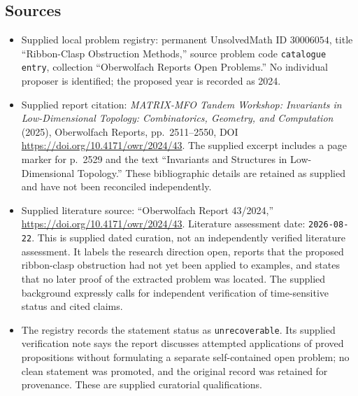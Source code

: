 \documentclass[11pt]{article}
\begin{document}
\subsection{Sources}
\begin{itemize}
\item Supplied local problem registry: permanent UnsolvedMath ID \(30006054\), title ``Ribbon-Clasp Obstruction Methods,'' source problem code \texttt{catalogue entry}, collection ``Oberwolfach Reports Open Problems.'' No individual proposer is identified; the proposed year is recorded as 2024.
\item Supplied report citation: \emph{MATRIX-MFO Tandem Workshop: Invariants in Low-Dimensional Topology: Combinatorics, Geometry, and Computation} (2025), Oberwolfach Reports, pp.\ 2511--2550, DOI \url{https://doi.org/10.4171/owr/2024/43}. The supplied excerpt includes a page marker for p.\ 2529 and the text ``Invariants and Structures in Low-Dimensional Topology.'' These bibliographic details are retained as supplied and have not been reconciled independently.
\item Supplied literature source: ``Oberwolfach Report 43/2024,'' \url{https://doi.org/10.4171/owr/2024/43}. Literature assessment date: \texttt{2026-08-22}. This is supplied dated curation, not an independently verified literature assessment. It labels the research direction open, reports that the proposed ribbon-clasp obstruction had not yet been applied to examples, and states that no later proof of the extracted problem was located. The supplied background expressly calls for independent verification of time-sensitive status and cited claims.
\item The registry records the statement status as \texttt{unrecoverable}. Its supplied verification note says the report discusses attempted applications of proved propositions without formulating a separate self-contained open problem; no clean statement was promoted, and the original record was retained for provenance. These are supplied curatorial qualifications.
\end{itemize}
\end{document}
